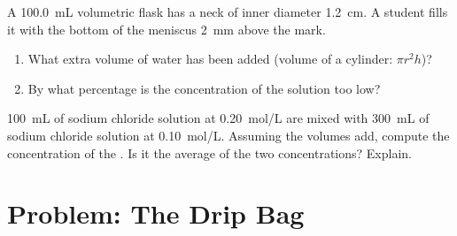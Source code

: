 \begin{exercise}[$\star\star\star$]\label{exo:g10:concentration-and-dilution:14}
A \qty{100.0}{mL} volumetric flask has a neck of inner diameter
\qty{1.2}{cm}. A student fills it with the bottom of the meniscus
\qty{2}{mm} above the mark.
\begin{enumerate}
  \item What extra volume of water has been added (volume of a cylinder:
        $\pi r^2 h$)?
  \item By what percentage is the concentration of the solution too low?
\end{enumerate}
\end{exercise}

\begin{exercise}[$\star\star\star$]\label{exo:g10:concentration-and-dilution:15}
\qty{100}{mL} of sodium chloride solution at \qty{0.20}{mol/L} are mixed
with \qty{300}{mL} of sodium chloride solution at \qty{0.10}{mol/L}.
Assuming the volumes add, compute the concentration of the . Is
it the average of the two concentrations? Explain.
\end{exercise}

\section{Problem: The Drip Bag}

